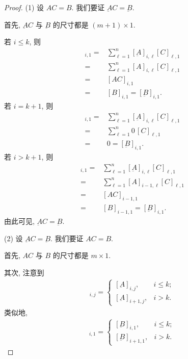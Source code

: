 \begin{proof}
    (1)
    设 \(AC = B\).
    我们要证 \(\underbar{A}C = \underbar{B}\).

    首先, \(\underbar{A}C\) 与 \(\underbar{B}\)
    的尺寸都是 \((m+1) \times 1\).

    若 \(i \leq k\), 则
    \begin{align*}
        [\underbar{A}C]_{i,1}
        = {} &
        \sum_{\ell = 1}^{n}
        {[\underbar{A}]_{i,\ell} [C]_{\ell,1}}
        \\
        = {} &
        \sum_{\ell = 1}^{n}
        {[A]_{i,\ell} [C]_{\ell,1}}
        \\
        = {} & [AC]_{i,1}
        \\
        = {} & [B]_{i,1}
            =
            [\underbar{B}]_{i,1}.
    \end{align*}
    若 \(i = k + 1\), 则
    \begin{align*}
        [\underbar{A}C]_{i,1}
        = {} &
        \sum_{\ell = 1}^{n}
        {[\underbar{A}]_{i,\ell} [C]_{\ell,1}}
        \\
        = {} &
        \sum_{\ell = 1}^{n}
        {0\,[C]_{\ell,1}}
        \\
        = {} & 0
        =
        [\underbar{B}]_{i,1}.
    \end{align*}
    若 \(i > k + 1\), 则
    \begin{align*}
        [\underbar{A}C]_{i,1}
        = {} &
        \sum_{\ell = 1}^{n}
        {[\underbar{A}]_{i,\ell} [C]_{\ell,1}}
        \\
        = {} &
        \sum_{\ell = 1}^{n}
        {[A]_{i-1,\ell} [C]_{\ell,1}}
        \\
        = {} & [AC]_{i-1,1}
        \\
        = {} & [B]_{i-1,1}
            =
            [\underbar{B}]_{i,1}.
    \end{align*}
    由此可见, \(\underbar{A}C = \underbar{B}\).

    (2)
    设 \(\underbar{A}C = \underbar{B}\).
    我们要证 \(AC = B\).

    首先, \(AC\) 与 \(B\)
    的尺寸都是 \(m \times 1\).

    其次, 注意到
    \begin{align*}
        [A]_{i,j}
        = \begin{cases}
              [\underbar{A}]_{i,j},   & i \leq k; \\
              [\underbar{A}]_{i+1,j}, & i > k.
          \end{cases}
    \end{align*}
    类似地,
    \begin{align*}
        [B]_{i,1}
        = \begin{cases}
              [\underbar{B}]_{i,1},   & i \leq k; \\
              [\underbar{B}]_{i+1,1}, & i > k.
          \end{cases}
    \end{align*}


\end{proof}

